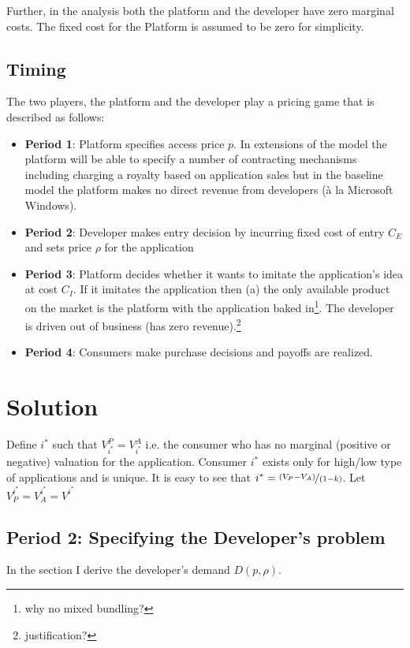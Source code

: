 \documentclass[12pt]{article}
\begin{document}
Further, in the analysis both the platform and the developer have zero marginal
costs. The fixed cost for the Platform is assumed to be zero for
simplicity. 

\subsection{Timing}
The two players, the platform and the developer play a pricing game that is described as
follows: 
\begin{itemize}
\item \textbf{Period 1}: Platform specifies access price $p$. In extensions of
  the model the platform will be able to specify a number of
  contracting mechanisms including charging a royalty based on
  application sales but in the baseline model the platform makes
  no direct revenue from developers (\`a la Microsoft Windows).
\item  \textbf{Period 2}: Developer makes entry decision by incurring fixed cost
  of entry $C_E$ and sets price $\rho$ for the application
\item  \textbf{Period 3}: Platform decides whether it wants to imitate the application's idea at
  cost $C_I$. If it imitates the application then (a) the only
  available product on the market is the platform with the application
  baked in\footnote{why no mixed bundling?}. The developer is driven
  out of business (has zero revenue).\footnote{justification?}
\item  \textbf{Period 4}: Consumers make purchase decisions and payoffs are
  realized. 
\end{itemize}


\section{Solution}

Define $i^*$ such that $V_{i^*}^P=V_{i^*}^A$ i.e. the consumer who
has no marginal (positive or negative) valuation for the
application. Consumer $i^*$ exists only for high/low type of
applications and is unique. It is easy to see that
$i^*=\nicefrac{(V_P-V_A)}{(1-k)}$. Let $V^{i^*}_P =
V^{i^*}_A = V^{i^*}$

\subsection{Period 2: Specifying the Developer's problem}

In the section I derive the developer's demand $D(p,\rho)$.
\end{document}
